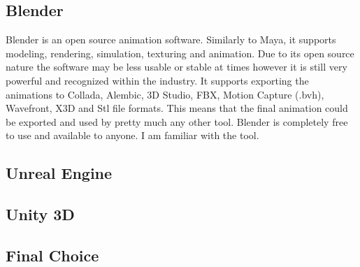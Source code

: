 \subsection{Blender}
Blender is an open source animation software. Similarly to Maya, it supports modeling, rendering, simulation, texturing and animation. Due to its open source nature the software may be less usable or stable at times however it is still very powerful and recognized within the industry. It supports exporting the animations to Collada, Alembic, 3D Studio, FBX, Motion Capture (.bvh), Wavefront, X3D and Stl file formats. This means that the final animation could be exported and used by pretty much any other tool. Blender is completely free to use and available to anyone. I am familiar with the tool.


\subsection{Unreal Engine}


\subsection{Unity 3D}
\subsection{Final Choice}





